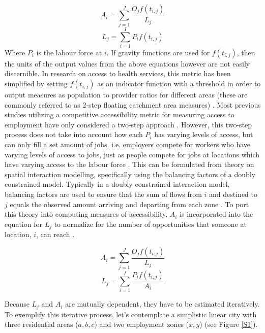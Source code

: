 \documentclass[11 pt, letterpaper]{article}
\begin{document}
{\begin{equation}
A_{i} = \sum_{j = 1}^{J} \frac{ O_j f(t_{i,j})}{L_{j}}
\end{equation}
\begin{equation}
L_j = \sum_{i = 1}^{I} P_i f(t_{i,j})
\end{equation}
Where $P_i$ is the labour force at $i$. If gravity functions are used for $f(t_{i,j})$, then the units of the output values from the above equations however are not easily discernible. In research on access to health services, this metric has been simplified by setting $f(t_{i,j})$ as an indicator function with a threshold in order to output measures as population to provider ratios for different areas (these are commonly referred to as 2-step floating catchment area measures) \cite{luo2003,delamater2013}. Most previous studies utilizing a competitive accessibility metric for measuring access to employment have only considered a two-step approach . However, this two-step process does not take into account how each $P_i$ has varying levels of access, but can only fill a set amount of jobs. i.e. employers compete for workers who have varying levels of access to jobs, just as people compete for jobs at locations which have varying access to the labour force \cite{geurs2003}. This can be formulated from theory on spatial interaction modelling, specifically using the balancing factors of a doubly constrained model. Typically in a doubly constrained interaction model, balancing factors are used to ensure that the sum of flows from $i$ and destined to $j$ equals the observed amount arriving and departing from each zone \cite{wilson1971,fotheringham1989}. To port this theory into computing measures of accessibility, $A_i$ is incorporated into the equation for $L_j$ to normalize for the number of opportunities that someone at location, $i$, can reach  \cite{geurs2003,merlin2017}.

\begin{equation}
A_{i} = \sum_{j = 1}^{J} \frac{ O_j f(t_{i,j})}{L_{j}} 
\end{equation}
\begin{equation}
L_j = \sum_{i = 1}^{I} \frac{ P_i f(t_{i,j})}{A_{i}}
\end{equation}

Because $L_j$ and $A_i$ are mutually dependent, they have to be estimated iteratively. To exemplify this iterative process, let's contemplate a simplistic linear city with three residential areas ($a,b,c$) and two employment zones ($x,y$) (see Figure \ref{S1}).

}
\end{document}
